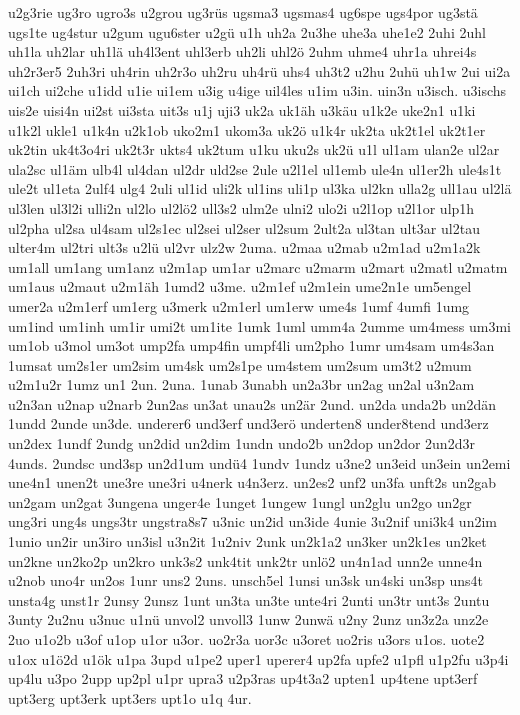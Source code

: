 {u2g3rie
ug3ro
ugro3s
u2grou
ug3rüs
ugsma3
ugsmas4
ug6spe
ugs4por
ug3stä
ugs1te
ug4stur
u2gum
ugu6ster
u2gü
u1h
uh2a
2u3he
uhe3a
uhe1e2
2uhi
2uhl
uh1la
uh2lar
uh1lä
uh4l3ent
uhl3erb
uh2li
uhl2ö
2uhm
uhme4
uhr1a
uhrei4s
uh2r3er5
2uh3ri
uh4rin
uh2r3o
uh2ru
uh4rü
uhs4
uh3t2
u2hu
2uhü
uh1w
2ui
ui2a
ui1ch
ui2che
u1idd
u1ie
ui1em
u3ig
u4ige
uil4les
u1im
u3in.
uin3n
u3isch.
u3ischs
uis2e
uisi4n
ui2st
ui3sta
uit3s
u1j
uji3
uk2a
uk1äh
u3käu
u1k2e
uke2n1
u1ki
u1k2l
ukle1
u1k4n
u2k1ob
uko2m1
ukom3a
uk2ö
u1k4r
uk2ta
uk2t1el
uk2t1er
uk2tin
uk4t3o4ri
uk2t3r
ukts4
uk2tum
u1ku
uku2s
uk2ü
u1l
ul1am
ulan2e
ul2ar
ula2sc
ul1äm
ulb4l
ul4dan
ul2dr
uld2se
2ule
u2l1el
ul1emb
ule4n
ul1er2h
ule4s1t
ule2t
ul1eta
2ulf4
ulg4
2uli
ul1id
uli2k
ul1ins
uli1p
ul3ka
ul2kn
ulla2g
ull1au
ul2lä
ul3len
ul3l2i
ulli2n
ul2lo
ul2lö2
ull3s2
ulm2e
ulni2
ulo2i
u2l1op
u2l1or
ulp1h
ul2pha
ul2sa
ul4sam
ul2s1ec
ul2sei
ul2ser
ul2sum
2ult2a
ul3tan
ult3ar
ul2tau
ulter4m
ul2tri
ult3s
u2lü
ul2vr
ulz2w
2uma.
u2maa
u2mab
u2m1ad
u2m1a2k
um1all
um1ang
um1anz
u2m1ap
um1ar
u2marc
u2marm
u2mart
u2matl
u2matm
um1aus
u2maut
u2m1äh
1umd2
u3me.
u2m1ef
u2m1ein
ume2n1e
um5engel
umer2a
u2m1erf
um1erg
u3merk
u2m1erl
um1erw
ume4s
1umf
4umfi
1umg
um1ind
um1inh
um1ir
umi2t
um1ite
1umk
1uml
umm4a
2umme
um4mess
um3mi
um1ob
u3mol
um3ot
ump2fa
ump4fin
umpf4li
um2pho
1umr
um4sam
um4s3an
1umsat
um2s1er
um2sim
um4sk
um2s1pe
um4stem
um2sum
um3t2
u2mum
u2m1u2r
1umz
un1
2un.
2una.
1unab
3unabh
un2a3br
un2ag
un2al
u3n2am
u2n3an
u2nap
u2narb
2un2as
un3at
unau2s
un2är
2und.
un2da
unda2b
un2dän
1undd
2unde
un3de.
underer6
und3erf
und3erö
underten8
under8tend
und3erz
un2dex
1undf
2undg
un2did
un2dim
1undn
undo2b
un2dop
un2dor
2un2d3r
4unds.
2undsc
und3sp
un2d1um
undü4
1undv
1undz
u3ne2
un3eid
un3ein
un2emi
une4n1
unen2t
une3re
une3ri
u4nerk
u4n3erz.
un2es2
unf2
un3fa
unft2s
un2gab
un2gam
un2gat
3ungena
unger4e
1unget
1ungew
1ungl
un2glu
un2go
un2gr
ung3ri
ung4s
ungs3tr
ungstra8s7
u3nic
un2id
un3ide
4unie
3u2nif
uni3k4
un2im
1unio
un2ir
un3iro
un3isl
u3n2it
1u2niv
2unk
un2k1a2
un3ker
un2k1es
un2ket
un2kne
un2ko2p
un2kro
unk3s2
unk4tit
unk2tr
unlö2
un4n1ad
unn2e
unne4n
u2nob
uno4r
un2os
1unr
uns2
2uns.
unsch5el
1unsi
un3sk
un4ski
un3sp
uns4t
unsta4g
unst1r
2unsy
2unsz
1unt
un3ta
un3te
unte4ri
2unti
un3tr
unt3s
2untu
3unty
2u2nu
u3nuc
u1nü
unvol2
unvoll3
1unw
2unwä
u2ny
2unz
un3z2a
unz2e
2uo
u1o2b
u3of
u1op
u1or
u3or.
uo2r3a
uor3c
u3oret
uo2ris
u3ors
u1os.
uote2
u1ox
u1ö2d
u1ök
u1pa
3upd
u1pe2
uper1
uperer4
up2fa
upfe2
u1pfl
u1p2fu
u3p4i
up4lu
u3po
2upp
up2pl
u1pr
upra3
u2p3ras
up4t3a2
upten1
up4tene
upt3erf
upt3erg
upt3erk
upt3ers
upt1o
u1q
4ur.
}
